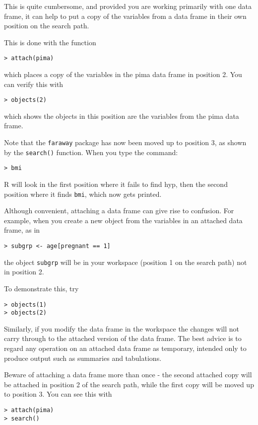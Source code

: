 \documentclass[12pt]{article}
\begin{document}
This is quite cumbersome, and provided you are working primarily with one data frame, it can help to put a copy of the variables from a data frame in their own position on the
search path. 

This is done with the function
\begin{verbatim}
> attach(pima)
\end{verbatim}
which places a copy of the variables in the pima data frame in position 2. You can verify this with
\begin{verbatim}
> objects(2)
\end{verbatim}
which shows the objects in this position are the variables from the pima data frame. 

Note that the \texttt{faraway} package has now been moved up to position 3, as shown by the \texttt{search()} function. When you type the command:

\begin{verbatim}
> bmi
\end{verbatim}
R will look in the first position where it fails to find hyp, then the second position where it finds \texttt{bmi}, which now gets printed.

Although convenient, attaching a data frame can give rise to confusion. For example, when you create a new object from the variables in an attached data frame, as in

\begin{verbatim}
> subgrp <- age[pregnant == 1]
\end{verbatim}

the object \texttt{subgrp} will be in your workspace (position 1 on the search path) not in position 2. 

To demonstrate this, try
\begin{verbatim}
> objects(1)
> objects(2)
\end{verbatim}

Similarly, if you modify the data frame in the workspace the changes will not carry through to the
attached version of the data frame. The best advice is to regard any operation on an attached
data frame as temporary, intended only to produce output such as summaries and tabulations.


Beware of attaching a data frame more than once - the second attached copy will be attached
in position 2 of the search path, while the first copy will be moved up to position 3. You can see
this with

\begin{verbatim}
> attach(pima)
> search()
\end{verbatim}
\end{document}
